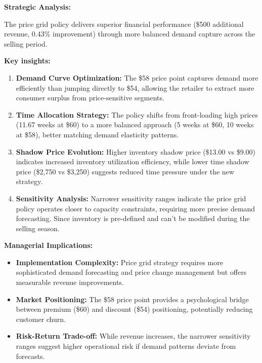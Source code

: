 \documentclass[12pt]{article}
\begin{document}
\begin{enumerate}[label= (\alph*), leftmargin=2em]
\textbf{Strategic Analysis:}

The price grid policy delivers superior financial performance (\$500 additional revenue, 0.43\% improvement) through more balanced demand capture across the selling period. 

\textbf{Key insights:}

\begin{enumerate}[nosep]
\item \textbf{Demand Curve Optimization:} The \$58 price point captures demand more efficiently than jumping directly to \$54, allowing the retailer to extract more consumer surplus from price-sensitive segments.

\item \textbf{Time Allocation Strategy:} The policy shifts from front-loading high prices (11.67 weeks at \$60) to a more balanced approach (5 weeks at \$60, 10 weeks at \$58), better matching demand elasticity patterns.

\item \textbf{Shadow Price Evolution:} Higher inventory shadow price (\$13.00 vs \$9.00) indicates increased inventory utilization efficiency, while lower time shadow price (\$2,750 vs \$3,250) suggests reduced time pressure under the new strategy.

\item \textbf{Sensitivity Analysis:} Narrower sensitivity ranges indicate the price grid policy operates closer to capacity constraints, requiring more precise demand forecasting. Since inventory is pre-defined and can't be modified during the selling season.
\end{enumerate}

\textbf{Managerial Implications:}

\begin{itemize}[nosep]
\item \textbf{Implementation Complexity:} Price grid strategy requires more sophisticated demand forecasting and price change management but offers measurable revenue improvements.
\item \textbf{Market Positioning:} The \$58 price point provides a psychological bridge between premium (\$60) and discount (\$54) positioning, potentially reducing customer churn.
\item \textbf{Risk-Return Trade-off:} While revenue increases, the narrower sensitivity ranges suggest higher operational risk if demand patterns deviate from forecasts.
\end{itemize}
\end{enumerate}
\end{document}
